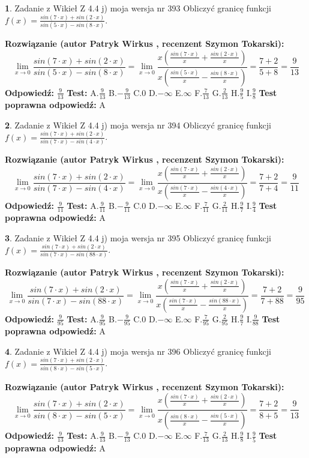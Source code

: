 \documentclass[12pt, a4paper]{article}
\theoremstyle{definition} %
\newtheorem{zad}{}
\newcommand{\zadStart}[1]{\begin{zad}#1\newline}
\newcommand{\zadStop}{\end{zad}}
\newcommand{\rozwStart}[2]{\noindent \textbf{Rozwiązanie (autor #1 , recenzent #2): }\newline}
\newcommand{\rozwStop}{\newline}
\newcommand{\odpStart}{\noindent \textbf{Odpowiedź:}\newline}
\newcommand{\odpStop}{\newline}
\newcommand{\testStart}{\noindent \textbf{Test:}\newline}
\newcommand{\testStop}{\newline}
\newcommand{\kluczStart}{\noindent \textbf{Test poprawna odpowiedź:}\newline}
\newcommand{\kluczStop}{\newline}
\begin{document}
\zadStart{Zadanie z Wikieł Z 4.4 j) moja wersja nr 393}
Obliczyć granicę funkcji $f(x)=\frac{sin(7\cdot x) +sin(2\cdot x)}{sin(5\cdot x) -sin(8\cdot x)}$.
\zadStop
\rozwStart{Patryk Wirkus}{Szymon Tokarski}
$$\lim\limits_{x\to 0}\frac{sin(7\cdot x) +sin(2\cdot x)}{sin(5\cdot x) -sin(8\cdot x)}=\lim\limits_{x\to 0}\frac{x(\frac{sin(7\cdot x)}{x}+\frac{sin(2\cdot x)}{x})}{x(\frac{sin(5\cdot x)}{x}-\frac{sin(8\cdot x)}{x})}=\frac{7+2}{5+8} = \frac{9}{13}$$
\rozwStop
\odpStart
$\frac{9}{13}$
\odpStop
\testStart
A.$\frac{9}{13}$
B.$-\frac{9}{13}$
C.$0$
D.$-\infty$
E.$\infty$
F.$\frac{7}{13}$
G.$\frac{2}{13}$
H.$\frac{9}{5}$
I.$\frac{9}{8}$
\testStop
\kluczStart
A
\kluczStop



\zadStart{Zadanie z Wikieł Z 4.4 j) moja wersja nr 394}
Obliczyć granicę funkcji $f(x)=\frac{sin(7\cdot x) +sin(2\cdot x)}{sin(7\cdot x) -sin(4\cdot x)}$.
\zadStop
\rozwStart{Patryk Wirkus}{Szymon Tokarski}
$$\lim\limits_{x\to 0}\frac{sin(7\cdot x) +sin(2\cdot x)}{sin(7\cdot x) -sin(4\cdot x)}=\lim\limits_{x\to 0}\frac{x(\frac{sin(7\cdot x)}{x}+\frac{sin(2\cdot x)}{x})}{x(\frac{sin(7\cdot x)}{x}-\frac{sin(4\cdot x)}{x})}=\frac{7+2}{7+4} = \frac{9}{11}$$
\rozwStop
\odpStart
$\frac{9}{11}$
\odpStop
\testStart
A.$\frac{9}{11}$
B.$-\frac{9}{11}$
C.$0$
D.$-\infty$
E.$\infty$
F.$\frac{7}{11}$
G.$\frac{2}{11}$
H.$\frac{9}{7}$
I.$\frac{9}{4}$
\testStop
\kluczStart
A
\kluczStop



\zadStart{Zadanie z Wikieł Z 4.4 j) moja wersja nr 395}
Obliczyć granicę funkcji $f(x)=\frac{sin(7\cdot x) +sin(2\cdot x)}{sin(7\cdot x) -sin(88\cdot x)}$.
\zadStop
\rozwStart{Patryk Wirkus}{Szymon Tokarski}
$$\lim\limits_{x\to 0}\frac{sin(7\cdot x) +sin(2\cdot x)}{sin(7\cdot x) -sin(88\cdot x)}=\lim\limits_{x\to 0}\frac{x(\frac{sin(7\cdot x)}{x}+\frac{sin(2\cdot x)}{x})}{x(\frac{sin(7\cdot x)}{x}-\frac{sin(88\cdot x)}{x})}=\frac{7+2}{7+88} = \frac{9}{95}$$
\rozwStop
\odpStart
$\frac{9}{95}$
\odpStop
\testStart
A.$\frac{9}{95}$
B.$-\frac{9}{95}$
C.$0$
D.$-\infty$
E.$\infty$
F.$\frac{7}{95}$
G.$\frac{2}{95}$
H.$\frac{9}{7}$
I.$\frac{9}{88}$
\testStop
\kluczStart
A
\kluczStop



\zadStart{Zadanie z Wikieł Z 4.4 j) moja wersja nr 396}
Obliczyć granicę funkcji $f(x)=\frac{sin(7\cdot x) +sin(2\cdot x)}{sin(8\cdot x) -sin(5\cdot x)}$.
\zadStop
\rozwStart{Patryk Wirkus}{Szymon Tokarski}
$$\lim\limits_{x\to 0}\frac{sin(7\cdot x) +sin(2\cdot x)}{sin(8\cdot x) -sin(5\cdot x)}=\lim\limits_{x\to 0}\frac{x(\frac{sin(7\cdot x)}{x}+\frac{sin(2\cdot x)}{x})}{x(\frac{sin(8\cdot x)}{x}-\frac{sin(5\cdot x)}{x})}=\frac{7+2}{8+5} = \frac{9}{13}$$
\rozwStop
\odpStart
$\frac{9}{13}$
\odpStop
\testStart
A.$\frac{9}{13}$
B.$-\frac{9}{13}$
C.$0$
D.$-\infty$
E.$\infty$
F.$\frac{7}{13}$
G.$\frac{2}{13}$
H.$\frac{9}{8}$
I.$\frac{9}{5}$
\testStop
\kluczStart
A
\kluczStop
\end{document}
